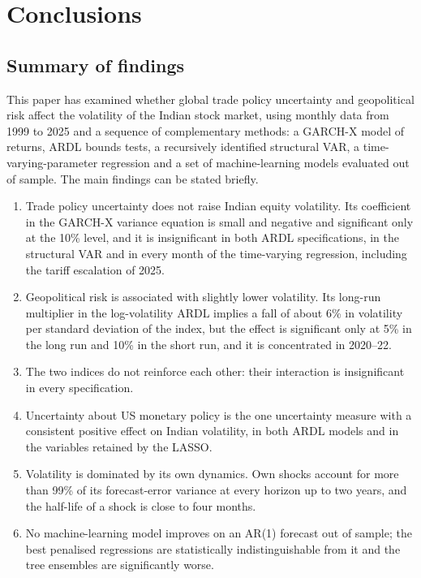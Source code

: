 \documentclass[10pt,twocolumn,a4paper]{article}
\begin{document}
\section{Conclusions}\label{sec:conclusion}

\subsection{Summary of findings}

This paper has examined whether global trade policy uncertainty and geopolitical risk affect the volatility of the Indian stock market, using monthly data from 1999 to 2025 and a sequence of complementary methods: a GARCH-X model of returns, ARDL bounds tests, a recursively identified structural VAR, a time-varying-parameter regression and a set of machine-learning models evaluated out of sample. The main findings can be stated briefly.

\begin{enumerate}
  \item Trade policy uncertainty does not raise Indian equity volatility. Its coefficient in the GARCH-X variance equation is small and negative and significant only at the 10\% level, and it is insignificant in both ARDL specifications, in the structural VAR and in every month of the time-varying regression, including the tariff escalation of 2025.
  \item Geopolitical risk is associated with slightly lower volatility. Its long-run multiplier in the log-volatility ARDL implies a fall of about 6\% in volatility per standard deviation of the index, but the effect is significant only at 5\% in the long run and 10\% in the short run, and it is concentrated in 2020--22.
  \item The two indices do not reinforce each other: their interaction is insignificant in every specification.
  \item Uncertainty about US monetary policy is the one uncertainty measure with a consistent positive effect on Indian volatility, in both ARDL models and in the variables retained by the LASSO.
  \item Volatility is dominated by its own dynamics. Own shocks account for more than 99\% of its forecast-error variance at every horizon up to two years, and the half-life of a shock is close to four months.
  \item No machine-learning model improves on an AR(1) forecast out of sample; the best penalised regressions are statistically indistinguishable from it and the tree ensembles are significantly worse.
\end{enumerate}
\end{document}
